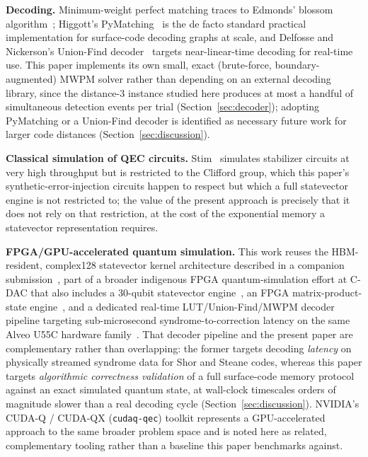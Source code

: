 \documentclass[pdflatex,sn-mathphys,Numbered]{sn-jnl}
\begin{document}
\textbf{Decoding.} Minimum-weight perfect matching traces to Edmonds' blossom algorithm~\cite{edmonds1965}; Higgott's PyMatching~\cite{higgott2022} is the de facto standard practical implementation for surface-code decoding graphs at scale, and Delfosse and Nickerson's Union-Find decoder~\cite{delfosse2021} targets near-linear-time decoding for real-time use. This paper implements its own small, exact (brute-force, boundary-augmented) MWPM solver rather than depending on an external decoding library, since the distance-3 instance studied here produces at most a handful of simultaneous detection events per trial (Section~\ref{sec:decoder}); adopting PyMatching or a Union-Find decoder is identified as necessary future work for larger code distances (Section~\ref{sec:discussion}).

\textbf{Classical simulation of QEC circuits.} Stim~\cite{gidney2021stim} simulates stabilizer circuits at very high throughput but is restricted to the Clifford group, which this paper's synthetic-error-injection circuits happen to respect but which a full statevector engine is not restricted to; the value of the present approach is precisely that it does not rely on that restriction, at the cost of the exponential memory a statevector representation requires.

\textbf{FPGA/GPU-accelerated quantum simulation.} This work reuses the HBM-resident, complex128 statevector kernel architecture described in a companion submission~\cite{ali_rtl_statevector}, part of a broader indigenous FPGA quantum-simulation effort at C-DAC that also includes a 30-qubit statevector engine~\cite{ali_30qubit_sim}, an FPGA matrix-product-state engine~\cite{ali_mps_engine}, and a dedicated real-time LUT/Union-Find/MWPM decoder pipeline targeting sub-microsecond syndrome-to-correction latency on the same Alveo U55C hardware family~\cite{ali_shor_steane_qec}. That decoder pipeline and the present paper are complementary rather than overlapping: the former targets decoding \emph{latency} on physically streamed syndrome data for Shor and Steane codes, whereas this paper targets \emph{algorithmic correctness validation} of a full surface-code memory protocol against an exact simulated quantum state, at wall-clock timescales orders of magnitude slower than a real decoding cycle (Section~\ref{sec:discussion}). NVIDIA's CUDA-Q / CUDA-QX (\texttt{cudaq-qec}) toolkit represents a GPU-accelerated approach to the same broader problem space and is noted here as related, complementary tooling rather than a baseline this paper benchmarks against.
\end{document}

